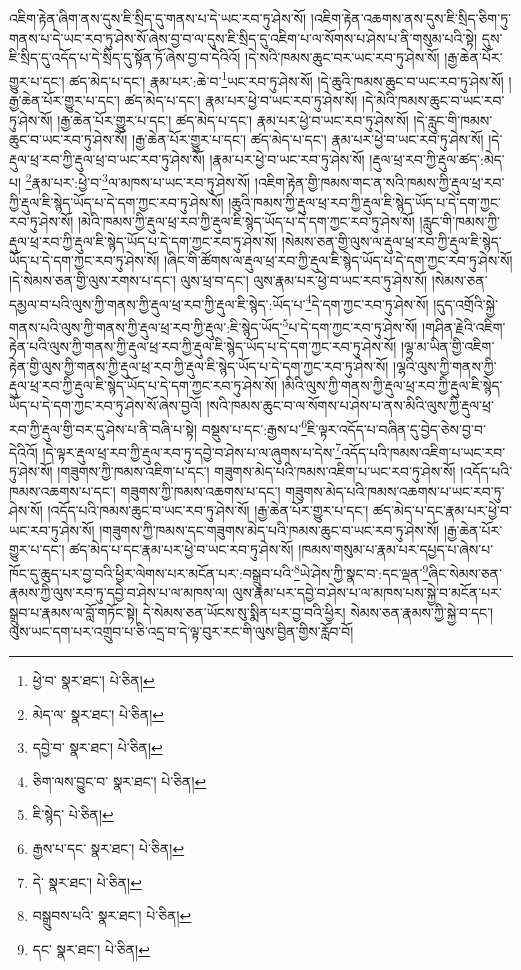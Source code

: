 འཇིག་རྟེན་ཞིག་ནས་དུས་ཇི་སྲིད་དུ་གནས་པ་དེ་ཡང་རབ་ཏུ་ཤེས་སོ། །འཇིག་རྟེན་འཆགས་ནས་དུས་ཇི་སྲིད་ཅིག་ཏུ་གནས་པ་དེ་ཡང་རབ་ཏུ་ཤེས་སོ་ཞེས་བྱ་བ་ལ་དུས་ཇི་སྲིད་དུ་འཇིག་པ་ལ་སོགས་པ་ཤེས་པ་ནི་གསུམ་པའི་སྟེ། དུས་ཇི་སྲིད་དུ་འདོད་པ་དེ་སྲིད་དུ་སྟོན་ཏོ་ཞེས་བྱ་བ་དེའིའོ། །དེ་སའི་ཁམས་ཆུང་བར་ཡང་རབ་ཏུ་ཤེས་སོ། །རྒྱ་ཆེན་པོར་གྱུར་པ་དང་། ཚད་མེད་པ་དང་། རྣམ་པར་:ཆེ་བ་\footnote{ཕྱེ་བ་  སྣར་ཐང་།  པེ་ཅིན། }ཡང་རབ་ཏུ་ཤེས་སོ། །དེ་ཆུའི་ཁམས་ཆུང་བ་ཡང་རབ་ཏུ་ཤེས་སོ། །རྒྱ་ཆེན་པོར་གྱུར་པ་དང་། ཚད་མེད་པ་དང་། རྣམ་པར་ཕྱེ་བ་ཡང་རབ་ཏུ་ཤེས་སོ། །དེ་མེའི་ཁམས་ཆུང་བ་ཡང་རབ་ཏུ་ཤེས་སོ། །རྒྱ་ཆེན་པོར་གྱུར་པ་དང་། ཚད་མེད་པ་དང་། རྣམ་པར་ཕྱེ་བ་ཡང་རབ་ཏུ་ཤེས་སོ། །དེ་རླུང་གི་ཁམས་ཆུང་བ་ཡང་རབ་ཏུ་ཤེས་སོ། །རྒྱ་ཆེན་པོར་གྱུར་པ་དང་། ཚད་མེད་པ་དང་། རྣམ་པར་ཕྱེ་བ་ཡང་རབ་ཏུ་ཤེས་སོ། །དེ་རྡུལ་ཕྲ་རབ་ཀྱི་རྡུལ་ཕྲ་བ་ཡང་རབ་ཏུ་ཤེས་སོ། །རྣམ་པར་ཕྱེ་བ་ཡང་རབ་ཏུ་ཤེས་སོ། །རྡུལ་ཕྲ་རབ་ཀྱི་རྡུལ་ཚད་:མེད་པ། \footnote{མེད་ལ་  སྣར་ཐང་།  པེ་ཅིན། }རྣམ་པར་:ཕྱེ་བ་\footnote{དབྱེ་བ་  སྣར་ཐང་།  པེ་ཅིན། }ལ་མཁས་པ་ཡང་རབ་ཏུ་ཤེས་སོ། །འཇིག་རྟེན་གྱི་ཁམས་གང་ན་སའི་ཁམས་ཀྱི་རྡུལ་ཕྲ་རབ་ཀྱི་རྡུལ་ཇི་སྙེད་ཡོད་པ་དེ་དག་ཀྱང་རབ་ཏུ་ཤེས་སོ། །ཆུའི་ཁམས་ཀྱི་རྡུལ་ཕྲ་རབ་ཀྱི་རྡུལ་ཇི་སྙེད་ཡོད་པ་དེ་དག་ཀྱང་རབ་ཏུ་ཤེས་སོ། །མེའི་ཁམས་ཀྱི་རྡུལ་ཕྲ་རབ་ཀྱི་རྡུལ་ཇི་སྙེད་ཡོད་པ་དེ་དག་ཀྱང་རབ་ཏུ་ཤེས་སོ། །རླུང་གི་ཁམས་ཀྱི་རྡུལ་ཕྲ་རབ་ཀྱི་རྡུལ་ཇི་སྙེད་ཡོད་པ་དེ་དག་ཀྱང་རབ་ཏུ་ཤེས་སོ། །སེམས་ཅན་གྱི་ལུས་ལ་རྡུལ་ཕྲ་རབ་ཀྱི་རྡུལ་ཇི་སྙེད་ཡོད་པ་དེ་དག་ཀྱང་རབ་ཏུ་ཤེས་སོ། །ཞིང་གི་ཚོགས་ལ་རྡུལ་ཕྲ་རབ་ཀྱི་རྡུལ་ཇི་སྙེད་ཡོད་པ་དེ་དག་ཀྱང་རབ་ཏུ་ཤེས་སོ། །དེ་སེམས་ཅན་གྱི་ལུས་རགས་པ་དང་། ལུས་ཕྲ་བ་དང་། ལུས་རྣམ་པར་ཕྱེ་བ་ཡང་རབ་ཏུ་ཤེས་སོ། །སེམས་ཅན་དམྱལ་བ་པའི་ལུས་ཀྱི་གནས་ཀྱི་རྡུལ་ཕྲ་རབ་ཀྱི་རྡུལ་ཇི་སྙེད་:ཡོད་པ་\footnote{ཅིག་ལས་བྱུང་བ་  སྣར་ཐང་།  པེ་ཅིན། }དེ་དག་ཀྱང་རབ་ཏུ་ཤེས་སོ། །དུད་འགྲོའི་སྐྱེ་གནས་པའི་ལུས་ཀྱི་གནས་ཀྱི་རྡུལ་ཕྲ་རབ་ཀྱི་རྡུལ་:ཇི་སྙེད་ཡོད་\footnote{ཇི་སྙེད་  པེ་ཅིན། }པ་དེ་དག་ཀྱང་རབ་ཏུ་ཤེས་སོ། །གཤིན་རྗེའི་འཇིག་རྟེན་པའི་ལུས་ཀྱི་གནས་ཀྱི་རྡུལ་ཕྲ་རབ་ཀྱི་རྡུལ་ཇི་སྙེད་ཡོད་པ་དེ་དག་ཀྱང་རབ་ཏུ་ཤེས་སོ། །ལྷ་མ་ཡིན་གྱི་འཇིག་རྟེན་གྱི་ལུས་ཀྱི་གནས་ཀྱི་རྡུལ་ཕྲ་རབ་ཀྱི་རྡུལ་ཇི་སྙེད་ཡོད་པ་དེ་དག་ཀྱང་རབ་ཏུ་ཤེས་སོ། །ལྷའི་ལུས་ཀྱི་གནས་ཀྱི་རྡུལ་ཕྲ་རབ་ཀྱི་རྡུལ་ཇི་སྙེད་ཡོད་པ་དེ་དག་ཀྱང་རབ་ཏུ་ཤེས་སོ། །མིའི་ལུས་ཀྱི་གནས་ཀྱི་རྡུལ་ཕྲ་རབ་ཀྱི་རྡུལ་ཇི་སྙེད་ཡོད་པ་དེ་དག་ཀྱང་རབ་ཏུ་ཤེས་སོ་ཞེས་བྱའོ། །སའི་ཁམས་ཆུང་བ་ལ་སོགས་པ་ཤེས་པ་ནས་མིའི་ལུས་ཀྱི་རྡུལ་ཕྲ་རབ་ཀྱི་རྡུལ་གྱི་བར་དུ་ཤེས་པ་ནི་བཞི་པ་སྟེ། བསྡུས་པ་དང་:རྒྱས་པ་\footnote{རྒྱས་པ་དང་  སྣར་ཐང་།  པེ་ཅིན། }ཇི་ལྟར་འདོད་པ་བཞིན་དུ་བྱེད་ཅེས་བྱ་བ་དེའིའོ། །དེ་ལྟར་རྡུལ་ཕྲ་རབ་ཀྱི་རྡུལ་རབ་ཏུ་དབྱེ་བ་ཤེས་པ་ལ་ཞུགས་པ་དེས་\footnote{དེ་  སྣར་ཐང་།  པེ་ཅིན། }འདོད་པའི་ཁམས་འཇིག་པ་ཡང་རབ་ཏུ་ཤེས་སོ། །གཟུགས་ཀྱི་ཁམས་འཇིག་པ་དང་། གཟུགས་མེད་པའི་ཁམས་འཇིག་པ་ཡང་རབ་ཏུ་ཤེས་སོ། །འདོད་པའི་ཁམས་འཆགས་པ་དང་། གཟུགས་ཀྱི་ཁམས་འཆགས་པ་དང་། གཟུགས་མེད་པའི་ཁམས་འཆགས་པ་ཡང་རབ་ཏུ་ཤེས་སོ། །འདོད་པའི་ཁམས་ཆུང་བ་ཡང་རབ་ཏུ་ཤེས་སོ། །རྒྱ་ཆེན་པོར་གྱུར་པ་དང་། ཚད་མེད་པ་དང་རྣམ་པར་ཕྱེ་བ་ཡང་རབ་ཏུ་ཤེས་སོ། །གཟུགས་ཀྱི་ཁམས་དང་གཟུགས་མེད་པའི་ཁམས་ཆུང་བ་ཡང་རབ་ཏུ་ཤེས་སོ། །རྒྱ་ཆེན་པོར་གྱུར་པ་དང་། ཚད་མེད་པ་དང་རྣམ་པར་ཕྱེ་བ་ཡང་རབ་ཏུ་ཤེས་སོ། །ཁམས་གསུམ་པ་རྣམ་པར་དཔྱད་པ་ཞེས་པ་ཁོང་དུ་ཆུད་པར་བྱ་བའི་ཕྱིར་ལེགས་པར་མངོན་པར་:བསྒྲུབ་པའི་\footnote{བསྒྲུབས་པའི་  སྣར་ཐང་།  པེ་ཅིན། }ཡེ་ཤེས་ཀྱི་སྣང་བ་:དང་ལྡན་\footnote{དང་  སྣར་ཐང་།  པེ་ཅིན། }ཞིང་སེམས་ཅན་རྣམས་ཀྱི་ལུས་རབ་ཏུ་དབྱེ་བ་ཤེས་པ་ལ་མཁས་ལ། ལུས་རྣམ་པར་དབྱེ་བ་ཤེས་པ་ལ་མཁས་པས་སྐྱེ་བ་མངོན་པར་སྒྲུབ་པ་རྣམས་ལ་བློ་གཏོང་སྟེ། དེ་སེམས་ཅན་ཡོངས་སུ་སྨིན་པར་བྱ་བའི་ཕྱིར། སེམས་ཅན་རྣམས་ཀྱི་སྐྱེ་བ་དང་། ལུས་ཡང་དག་པར་འགྲུབ་པ་ཅི་འདྲ་བ་དེ་ལྟ་བུར་རང་གི་ལུས་བྱིན་གྱིས་རློབ་བོ། 